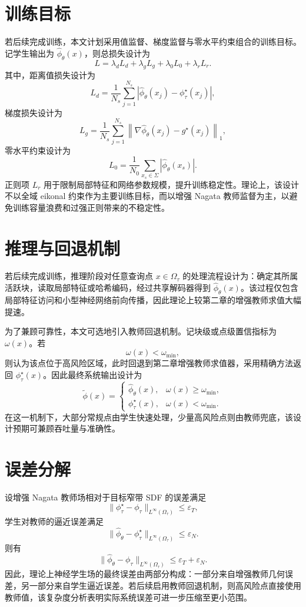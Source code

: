 \documentclass[12pt,oneside]{ctexbook}
\begin{document}
\section{训练目标}
若后续完成训练，本文计划采用值监督、梯度监督与零水平约束组合的训练目标。记学生输出为 $\hat\phi_\theta(x)$，则总损失设计为
\[
L=\lambda_d L_d+\lambda_g L_g+\lambda_0 L_0+\lambda_r L_r.
\]
其中，距离值损失设计为
\[
L_d=\frac{1}{N_s}\sum_{j=1}^{N_s}\left|\hat\phi_\theta(x_j)-\phi^\star_\tau(x_j)\right|,
\]
梯度损失设计为
\[
L_g=\frac{1}{N_s}\sum_{j=1}^{N_s}\left\|\nabla\hat\phi_\theta(x_j)-g^\star(x_j)\right\|_1,
\]
零水平约束设计为
\[
L_0=\frac{1}{N_0}\sum_{x_s\in\Sigma}\left|\hat\phi_\theta(x_s)\right|.
\]
正则项 $L_r$ 用于限制局部特征和网络参数规模，提升训练稳定性。理论上，该设计不以全域 eikonal 约束作为主要训练目标，而以增强 Nagata 教师监督为主，以避免训练容量浪费和过强正则带来的不稳定性。

\section{推理与回退机制}
若后续完成训练，推理阶段对任意查询点 $x\in\Omega_\tau$ 的处理流程设计为：确定其所属活跃块，读取局部特征或哈希编码，经过共享解码器得到 $\hat\phi_\theta(x)$。该过程仅包含局部特征访问和小型神经网络前向传播，因此理论上较第二章的增强教师求值大幅提速。

为了兼顾可靠性，本文可选地引入教师回退机制。记块级或点级置信指标为 $\omega(x)$。若
\[
\omega(x)<\omega_{\min},
\]
则认为该点位于高风险区域，此时回退到第二章增强教师求值器，采用精确方法返回 $\phi^\star_\tau(x)$。因此最终系统输出设计为
\[
\tilde\phi(x)=
\begin{cases}
\hat\phi_\theta(x), & \omega(x)\ge \omega_{\min},\\
\phi^\star_\tau(x), & \omega(x)<\omega_{\min}.
\end{cases}
\]
在这一机制下，大部分常规点由学生快速处理，少量高风险点则由教师兜底，该设计预期可兼顾吞吐量与准确性。

\section{误差分解}
设增强 Nagata 教师场相对于目标窄带 SDF 的误差满足
\[
\|\phi^\star_\tau-\phi_\tau\|_{L^\infty(\Omega_\tau)}\le \varepsilon_T,
\]
学生对教师的逼近误差满足
\[
\|\hat\phi_\theta-\phi^\star_\tau\|_{L^\infty(\Omega_\tau)}\le \varepsilon_N.
\]
则有
\[
\|\hat\phi_\theta-\phi_\tau\|_{L^\infty(\Omega_\tau)}
\le
\varepsilon_T+\varepsilon_N.
\]
因此，理论上神经学生场的最终误差由两部分构成：一部分来自增强教师几何误差，另一部分来自学生逼近误差。若后续启用教师回退机制，则高风险点直接使用教师值，该复杂度分析表明实际系统误差可进一步压缩至更小范围。
\end{document}
